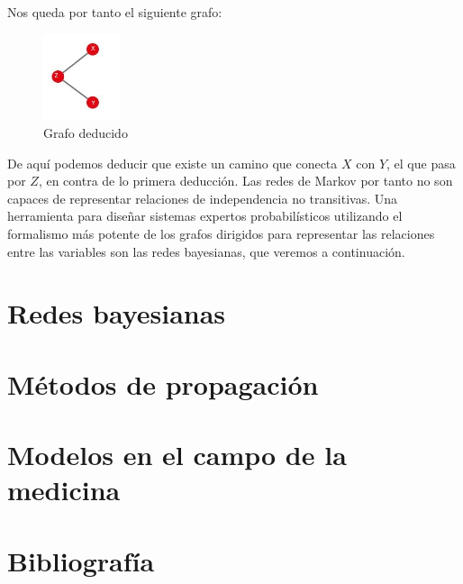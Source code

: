 \documentclass{article}
\begin{document}
\begin{enumerate}
Nos queda por tanto el siguiente grafo:
\begin{figure}[H]
\centering
\includegraphics[width=0.2\textwidth]{grafo}
\caption{Grafo deducido} \label{fig:grafo}
\end{figure}

De aquí podemos deducir que existe un camino que conecta $X$ con $Y$, el que pasa por $Z$, en contra de lo primera deducción. Las redes de Markov por tanto no son capaces de representar relaciones de independencia no transitivas. Una herramienta para diseñar sistemas expertos probabilísticos utilizando el formalismo más potente de los grafos dirigidos para representar las relaciones entre las variables son las redes bayesianas, que veremos a continuación.
\end{enumerate}

\section{Redes bayesianas}

\section{Métodos de propagación}

\section{Modelos en el campo de la medicina}

\section{Bibliografía}
\end{document}

